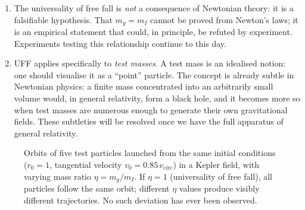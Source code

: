 \begin{remark}
\begin{enumerate}[(1)]
  \item The universality of free fall is \emph{not} a consequence of
    Newtonian theory: it is a falsifiable hypothesis.  That $m_g =
    m_I$ cannot be proved from Newton's laws; it is an empirical
    statement that could, in principle, be refuted by experiment.
    Experiments testing this relationship continue to this day.
  \item UFF applies specifically to \emph{test masses}.  A test mass
    is an idealised notion: one should visualise it as a ``point''
    particle.  The concept is already subtle in Newtonian physics: a
    finite mass concentrated into an arbitrarily small volume would, in
    general relativity, form a black hole, and it becomes more so when
    test masses are numerous enough to generate their own gravitational
    fields.  These subtleties will be resolved once we have the full
    apparatus of general relativity.
\end{enumerate}
\end{remark}

\begin{figure}[htbp]
  \centering
  
  \caption{Orbits of five test particles launched from the same initial
    conditions ($r_0 = 1$, tangential velocity $v_0 = 0.85\,v_{\mathrm{circ}}$)
    in a Kepler field, with varying mass ratio $\eta = m_g/m_I$.
    If $\eta = 1$ (universality of free fall), all particles follow the
    same orbit; different $\eta$ values produce visibly different
    trajectories.  No such deviation has ever been
    observed.}\label{fig:mass-ratio}
\end{figure}

